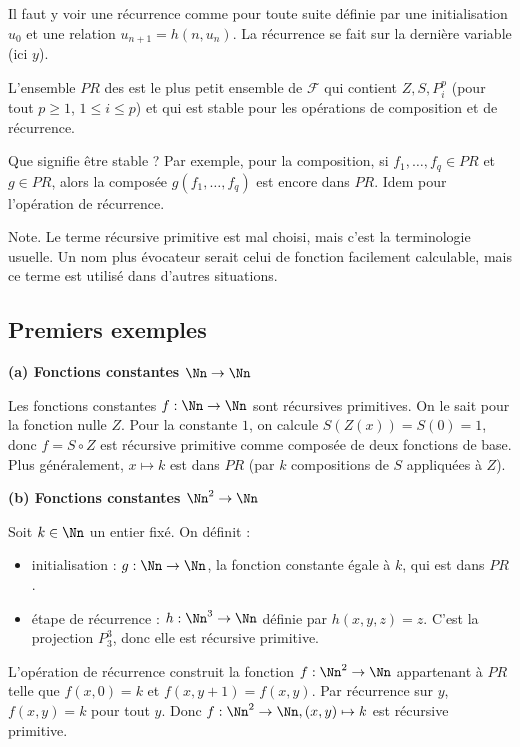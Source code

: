 \documentclass[11pt,class=report,crop=false]{standalone}
\begin{document}
Il faut y voir une récurrence comme pour toute suite définie par une initialisation $u_0$ et une relation $u_{n+1} = h(n, u_n)$. La récurrence se fait sur la dernière variable (ici $y$).

\begin{definition}
    L'ensemble $PR$ des  est le plus petit ensemble de $\mathcal{F}$ qui contient $Z, S, P_i^p$ (pour tout $p \ge 1$, $1 \le i \le p$) et qui est stable pour les opérations de composition et de récurrence.
\end{definition}

Que signifie \og{}être stable\fg{} ? Par exemple, pour la composition, si $f_1, \dots, f_q \in PR$ et $g \in PR$, alors la composée $g(f_1, \dots, f_q)$ est encore dans $PR$. Idem pour l'opération de récurrence.


Note. Le terme \og{}récursive primitive\fg{} est mal choisi, mais c'est la terminologie usuelle. Un nom plus évocateur serait celui de fonction \og{}facilement calculable\fg{}, mais ce terme est utilisé dans d'autres situations. 

\subsection{Premiers exemples} 

\textbf{(a) Fonctions constantes $\Nn \to \Nn$}

Les fonctions constantes $f : \Nn \to \Nn$ sont récursives primitives. On le sait pour la fonction nulle $Z$. Pour la constante $1$, on calcule $S(Z(x)) = S(0) = 1$, donc $f = S \circ Z$ est récursive primitive comme composée de deux fonctions de base.
Plus généralement, $x \mapsto k$ est dans $PR$ (par $k$ compositions de $S$ appliquées à $Z$).

\medskip

\textbf{(b) Fonctions constantes $\Nn^2 \to \Nn$}

Soit $k \in \Nn$ un entier fixé. On définit :
\begin{itemize}
    \item initialisation : $g : \Nn \to \Nn$, la fonction constante égale à $k$, qui est dans $PR$.
    \item étape de récurrence : $h : \Nn^3 \to \Nn$ définie par $h(x,y,z) = z$. C'est la projection $P_3^3$, donc elle est récursive primitive.
\end{itemize}
L'opération de récurrence construit la fonction $f : \Nn^2 \to \Nn$ appartenant à $PR$ telle que $f(x,0) = k$ et $f(x,y+1) = f(x,y)$. Par récurrence sur $y$, $f(x,y) = k$ pour tout $y$.
Donc $f : \Nn^2 \to \Nn, (x,y) \mapsto k$ est récursive primitive.
\end{document}
